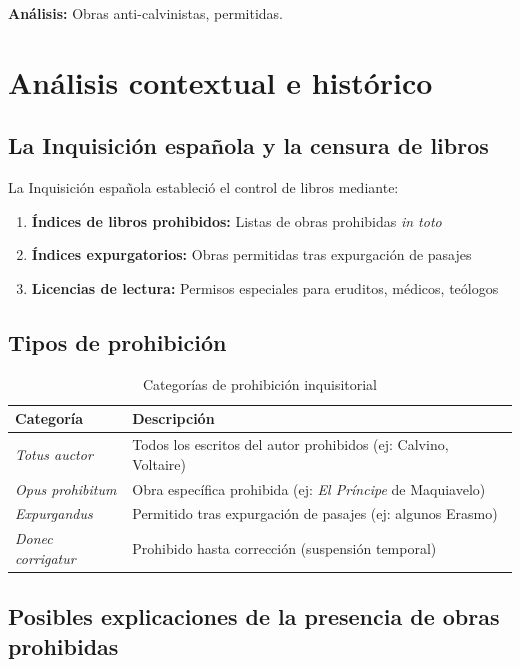 \documentclass[12pt,a4paper]{article}
\begin{document}
\textbf{Análisis:} Obras anti-calvinistas, permitidas.

\section{Análisis contextual e histórico}

\subsection{La Inquisición española y la censura de libros}

La Inquisición española estableció el control de libros mediante:

\begin{enumerate}
    \item \textbf{Índices de libros prohibidos:} Listas de obras prohibidas \textit{in toto}
    \item \textbf{Índices expurgatorios:} Obras permitidas tras expurgación de pasajes
    \item \textbf{Licencias de lectura:} Permisos especiales para eruditos, médicos, teólogos
\end{enumerate}

\subsection{Tipos de prohibición}

\begin{table}[h]
\centering
\caption{Categorías de prohibición inquisitorial}
\begin{tabular}{p{4cm}p{9cm}}
\toprule
\textbf{Categoría} & \textbf{Descripción} \\
\midrule
\textit{Totus auctor} & Todos los escritos del autor prohibidos (ej: Calvino, Voltaire) \\
\textit{Opus prohibitum} & Obra específica prohibida (ej: \textit{El Príncipe} de Maquiavelo) \\
\textit{Expurgandus} & Permitido tras expurgación de pasajes (ej: algunos Erasmo) \\
\textit{Donec corrigatur} & Prohibido hasta corrección (suspensión temporal) \\
\bottomrule
\end{tabular}
\end{table}

\subsection{Posibles explicaciones de la presencia de obras prohibidas}
\end{document}
